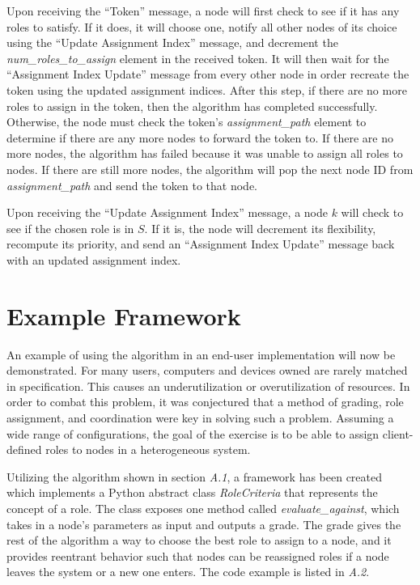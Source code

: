 \documentclass[11pt]{article}
\begin{document}
\begin{multicols}{2}
Upon receiving the ``Token'' message, a node will first check to see if it has any roles to satisfy. If it does, it will choose one, notify all other nodes of its choice using the ``Update Assignment Index'' message, and decrement the \textit{num\_roles\_to\_assign} element in the received token. It will then wait for the ``Assignment Index Update'' message from every other node in order recreate the token using the updated assignment indices. After this step, if there are no more roles to assign in the token, then the algorithm has completed successfully. Otherwise, the node must check the token's \textit{assignment\_path} element to determine if there are any more nodes to forward the token to. If there are no more nodes, the algorithm has failed because it was unable to assign all roles to nodes. If there are still more nodes, the algorithm will pop the next node ID from \textit{assignment\_path} and send the token to that node.

Upon receiving the ``Update Assignment Index'' message, a node $k$ will check to see if the chosen role is in $S$. If it is, the node will decrement its flexibility, recompute its priority, and send an ``Assignment Index Update'' message back with an updated assignment index.

\section{Example Framework}
An example of using the algorithm in an end-user implementation will now be demonstrated.  For many users, computers and devices owned are rarely matched in specification. This causes an underutilization or overutilization of resources.  In order to combat this problem, it was conjectured that a method of grading, role assignment, and coordination were key in solving such a problem.  Assuming a wide range of configurations, the goal of the exercise is to be able to assign client-defined roles to nodes in a heterogeneous system.

Utilizing the algorithm shown in section \textit{A.1}, a framework has been created which implements a Python abstract class \textit{RoleCriteria} that represents the concept of a role. The class exposes one method called \textit{evaluate\_against}, which takes in a node's parameters as input and outputs a grade. The grade gives the rest of the algorithm a way to choose the best role to assign to a node, and it provides reentrant behavior such that nodes can be reassigned roles if a node leaves the system or a new one enters.  The code example is listed in \textit{A.2}.


\end{multicols}
\end{document}
